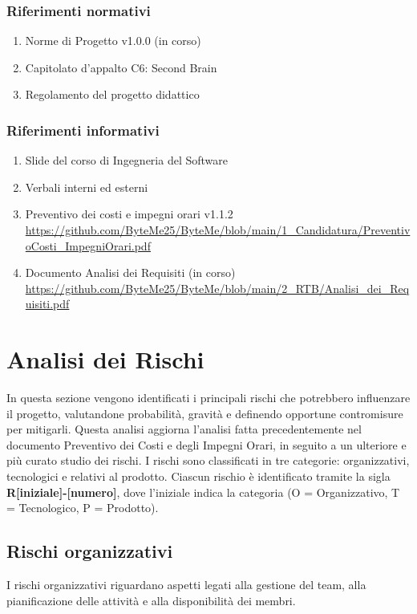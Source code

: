 \documentclass[11pt,a4paper]{article}
\begin{document}
\subsubsection{Riferimenti normativi}
\begin{enumerate}
    \item Norme di Progetto v1.0.0 (in corso)
    \item Capitolato d’appalto C6: Second Brain
    \item Regolamento del progetto didattico
\end{enumerate}

\subsubsection{Riferimenti informativi}
\begin{enumerate}
    \item Slide del corso di Ingegneria del Software
    \item Verbali interni ed esterni
    \item Preventivo dei costi e impegni orari v1.1.2 
    \url{https://github.com/ByteMe25/ByteMe/blob/main/1_Candidatura/PreventivoCosti_ImpegniOrari.pdf}
    \item Documento Analisi dei Requisiti (in corso) 
    \url{https://github.com/ByteMe25/ByteMe/blob/main/2_RTB/Analisi_dei_Requisiti.pdf}
\end{enumerate}

\newpage

\section{Analisi dei Rischi}
In questa sezione vengono identificati i principali rischi che potrebbero influenzare il progetto, valutandone probabilità, gravità e definendo opportune contromisure per mitigarli. Questa analisi aggiorna l'analisi fatta precedentemente nel documento Preventivo dei Costi e degli Impegni Orari, in seguito a un ulteriore e più curato studio dei rischi.
I rischi sono classificati in tre categorie: organizzativi, tecnologici e relativi al prodotto. Ciascun rischio è identificato tramite la sigla \textbf{R[iniziale]-[numero]}, dove l'iniziale indica la categoria (O = Organizzativo, T = Tecnologico, P = Prodotto).

\subsection{Rischi organizzativi}
I rischi organizzativi riguardano aspetti legati alla gestione del team, alla pianificazione delle attività e alla disponibilità dei membri.
\end{document}
